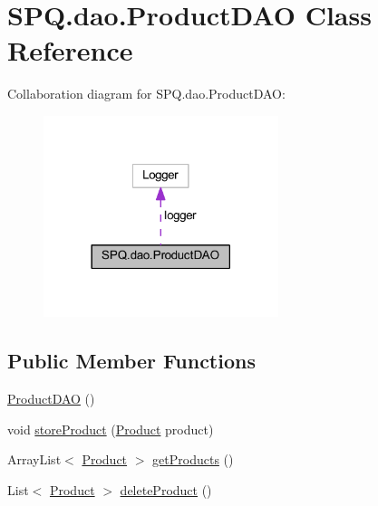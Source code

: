 \hypertarget{class_s_p_q_1_1dao_1_1_product_d_a_o}{}\section{S\+P\+Q.\+dao.\+Product\+D\+AO Class Reference}
\label{class_s_p_q_1_1dao_1_1_product_d_a_o}


Collaboration diagram for S\+P\+Q.\+dao.\+Product\+D\+AO\+:\nopagebreak
\begin{figure}[H]
\begin{center}
\leavevmode
\includegraphics[width=194pt]{class_s_p_q_1_1dao_1_1_product_d_a_o__coll__graph}
\end{center}
\end{figure}
\subsection*{Public Member Functions}
\begin{DoxyCompactItemize}
\item 
\mbox{\hyperlink{class_s_p_q_1_1dao_1_1_product_d_a_o_a16f6ce4efaca2c8d52d9af93d7cb6d1c}{Product\+D\+AO}} ()
\item 
void \mbox{\hyperlink{class_s_p_q_1_1dao_1_1_product_d_a_o_ae890d625011f3c28730259820c9f4f3c}{store\+Product}} (\mbox{\hyperlink{class_s_p_q_1_1data_1_1_product}{Product}} product)
\item 
Array\+List$<$ \mbox{\hyperlink{class_s_p_q_1_1data_1_1_product}{Product}} $>$ \mbox{\hyperlink{class_s_p_q_1_1dao_1_1_product_d_a_o_addd0016628e2b0db06969de5a944eace}{get\+Products}} ()
\item 
List$<$ \mbox{\hyperlink{class_s_p_q_1_1data_1_1_product}{Product}} $>$ \mbox{\hyperlink{class_s_p_q_1_1dao_1_1_product_d_a_o_acdc252858b17b13fe9677aa1a455bef3}{delete\+Product}} ()
\end{DoxyCompactItemize}


